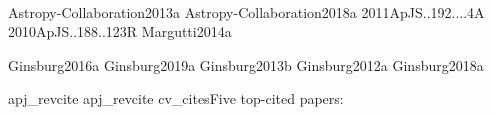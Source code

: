 \documentclass[12pt]{article}
\begin{document}

  









%




%


%



%





%
%
%
%
%






\nocite{biba}{Astropy-Collaboration2013a}
\nocite{biba}{Astropy-Collaboration2018a}
\nocite{biba}{2011ApJS..192....4A}
\nocite{biba}{2010ApJS..188..123R}
\nocite{biba}{Margutti2014a}

\nocite{bibb}{Ginsburg2016a}
\nocite{bibb}{Ginsburg2019a}
\nocite{bibb}{Ginsburg2013b}
\nocite{bibb}{Ginsburg2012a}
\nocite{bibb}{Ginsburg2018a}

{apj_revcite}
{apj_revcite}
%
%
{cv_cites}{Five top-cited papers:}
%
\end{document}
